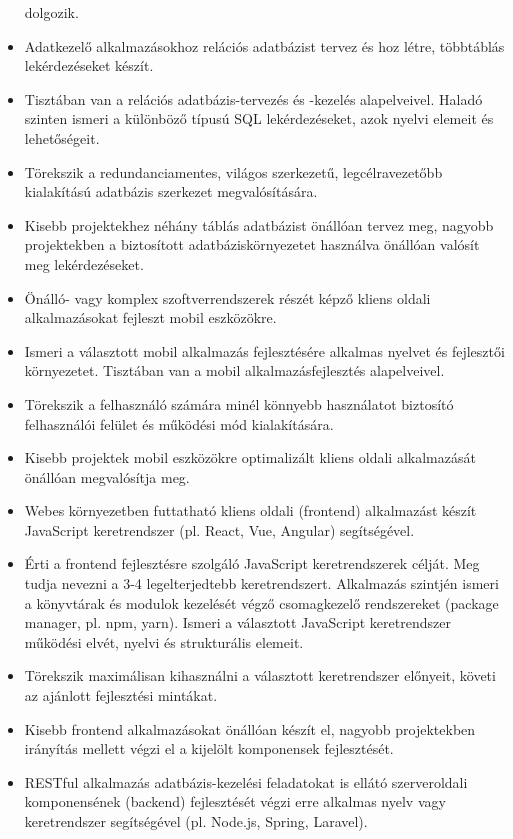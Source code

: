 \begin{itemize}
  dolgozik.
\item
  Adatkezelő alkalmazásokhoz relációs adatbázist tervez és hoz létre,
  többtáblás lekérdezéseket készít.
\item
  Tisztában van a relációs adatbázis-tervezés és -kezelés alapelveivel.
  Haladó szinten ismeri a különböző típusú SQL lekérdezéseket, azok
  nyelvi elemeit és lehetőségeit.
\item
  Törekszik a redundanciamentes, világos szerkezetű, legcélravezetőbb
  kialakítású adatbázis szerkezet megvalósítására.
\item
  Kisebb projektekhez néhány táblás adatbázist önállóan tervez meg,
  nagyobb projektekben a biztosított adatbáziskörnyezetet használva
  önállóan valósít meg lekérdezéseket.
\item
  Önálló- vagy komplex szoftverrendszerek részét képző kliens oldali
  alkalmazásokat fejleszt mobil eszközökre.
\item
  Ismeri a választott mobil alkalmazás fejlesztésére alkalmas nyelvet és
  fejlesztői környezetet. Tisztában van a mobil alkalmazásfejlesztés
  alapelveivel.
\item
  Törekszik a felhasználó számára minél könnyebb használatot biztosító
  felhasználói felület és működési mód kialakítására.
\item
  Kisebb projektek mobil eszközökre optimalizált kliens oldali
  alkalmazását önállóan megvalósítja meg.
\item
  Webes környezetben futtatható kliens oldali (frontend) alkalmazást
  készít JavaScript keretrendszer (pl. React, Vue, Angular)
  segítségével.
\item
  Érti a frontend fejlesztésre szolgáló JavaScript keretrendszerek
  célját. Meg tudja nevezni a 3-4 legelterjedtebb keretrendszert.
  Alkalmazás szintjén ismeri a könyvtárak és modulok kezelését végző
  csomagkezelő rendszereket (package manager, pl. npm, yarn). Ismeri a
  választott JavaScript keretrendszer működési elvét, nyelvi és
  strukturális elemeit.
\item
  Törekszik maximálisan kihasználni a választott keretrendszer előnyeit,
  követi az ajánlott fejlesztési mintákat.
\item
  Kisebb frontend alkalmazásokat önállóan készít el, nagyobb
  projektekben irányítás mellett végzi el a kijelölt komponensek
  fejlesztését.
\item
  RESTful alkalmazás adatbázis-kezelési feladatokat is ellátó
  szerveroldali komponensének (backend) fejlesztését végzi erre alkalmas
  nyelv vagy keretrendszer segítségével (pl. Node.js, Spring, Laravel).

\end{itemize}
